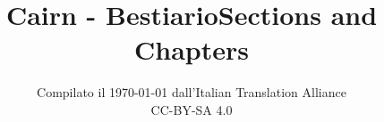 \documentclass[
  10pt,
  american,
]{extbook}
\title{Cairn - Bestiario}
\subtitle{Compilato il {\today} dall'Italian Translation Alliance \\ CC-BY-SA 4.0}
\date{}
\begin{document}
\AtBeginShipoutNext{\AtBeginShipoutDiscard}
\begin{minipage}{\textwidth}

\end{minipage}
\AtEndDocument{}
\maketitle
\thispagestyle{empty}
\AtBeginShipoutNext{\AtBeginShipoutDiscard}
\let\oldtoc\tableofcontents
\renewcommand{\contentsname}{\centering Creatures from A to Z}
\title{Sections and Chapters}
\renewcommand{\tableofcontents}{\oldtoc\newpage}
{
\pagestyle{empty}
\begin{multicols}{2}
\tableofcontents
\end{multicols}
}
\clearpage
{} 
\setcounter{page}{4} 

\end{document}
